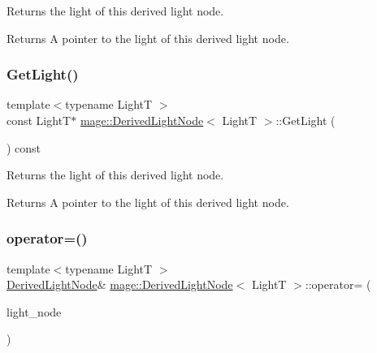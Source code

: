 Returns the light of this derived light node.

\begin{DoxyReturn}{Returns}
A pointer to the light of this derived light node. 
\end{DoxyReturn}
\hypertarget{classmage_1_1_derived_light_node_a61ace20169a3924d42abc163ebddc19b}{}\label{classmage_1_1_derived_light_node_a61ace20169a3924d42abc163ebddc19b} 
\subsubsection{\texorpdfstring{Get\+Light()}{GetLight()}\hspace{0.1cm}{\footnotesize\ttfamily [2/2]}}
{\footnotesize\ttfamily template$<$typename LightT $>$ \\
const LightT$\ast$ \hyperlink{classmage_1_1_derived_light_node}{mage\+::\+Derived\+Light\+Node}$<$ LightT $>$\+::Get\+Light (\begin{DoxyParamCaption}{ }\end{DoxyParamCaption}) const\hspace{0.3cm}{\ttfamily [noexcept]}}

Returns the light of this derived light node.

\begin{DoxyReturn}{Returns}
A pointer to the light of this derived light node. 
\end{DoxyReturn}
\hypertarget{classmage_1_1_derived_light_node_ad4a81ae2a671d6c278c74dead4660949}{}\label{classmage_1_1_derived_light_node_ad4a81ae2a671d6c278c74dead4660949} 
\subsubsection{\texorpdfstring{operator=()}{operator=()}\hspace{0.1cm}{\footnotesize\ttfamily [1/2]}}
{\footnotesize\ttfamily template$<$typename LightT $>$ \\
\hyperlink{classmage_1_1_derived_light_node}{Derived\+Light\+Node}\& \hyperlink{classmage_1_1_derived_light_node}{mage\+::\+Derived\+Light\+Node}$<$ LightT $>$\+::operator= (\begin{DoxyParamCaption}\item[{const \hyperlink{classmage_1_1_derived_light_node}{Derived\+Light\+Node}$<$ LightT $>$ \&}]{light\+\_\+node }\end{DoxyParamCaption})\hspace{0.3cm}{\ttfamily [delete]}}

